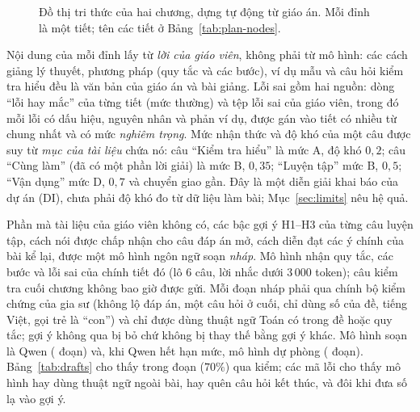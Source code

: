 \begin{figure}[tp]
\centering

\caption{Đồ thị tri thức của hai chương, dựng tự động từ giáo án. Mỗi đỉnh là một tiết; tên các tiết ở Bảng~\ref{tab:plan-nodes}.}
\label{fig:graph}
\end{figure}

Nội dung của mỗi đỉnh lấy từ \emph{lời của giáo viên}, không phải từ mô hình: các cách giảng lý thuyết, phương pháp (quy tắc và các bước), ví dụ mẫu và câu hỏi kiểm tra hiểu đều là văn bản của giáo án và bài giảng. Lỗi sai gồm hai nguồn: dòng ``lỗi hay mắc'' của từng tiết (mức thường) và tệp lỗi sai của giáo viên, trong đó mỗi lỗi có dấu hiệu, nguyên nhân và phản ví dụ, được gán vào tiết có nhiều từ chung nhất và có mức \emph{nghiêm trọng}. Mức nhận thức và độ khó của một câu được suy từ \emph{mục của tài liệu} chứa nó: câu ``Kiểm tra hiểu'' là mức A, độ khó $0{,}2$; câu ``Cùng làm'' (đã có một phần lời giải) là mức B, $0{,}35$; ``Luyện tập'' mức B, $0{,}5$; ``Vận dụng'' mức D, $0{,}7$ và chuyển giao gần. Đây là một diễn giải khai báo của dự án (DI), chưa phải độ khó đo từ dữ liệu làm bài; Mục~\ref{sec:limits} nêu hệ quả.

\begin{table}[tp]
\centering
\caption{Các tiết của hai chương và nội dung của từng tiết (số đơn vị). ``Sau'': các tiết phải học trước; ``Dạng, G/Đ'': số dạng câu cần thành công để qua tiết, \textbf{G} yêu cầu giải thích, \textbf{Đ} yêu cầu có bằng chứng vận dụng.}
\label{tab:plan-nodes}

\end{table}

Phần mà tài liệu của giáo viên không có, các bậc gợi ý H1--H3 của từng câu luyện tập, cách nói được chấp nhận cho câu đáp án mở, cách diễn đạt các ý chính của bài kể lại, được một mô hình ngôn ngữ soạn \emph{nháp}. Mô hình nhận quy tắc, các bước và lỗi sai của chính tiết đó (lô $6$ câu, lời nhắc dưới $3\,000$ token); câu kiểm tra cuối chương không bao giờ được gửi. Mỗi đoạn nháp phải qua chính bộ kiểm chứng của gia sư (không lộ đáp án, một câu hỏi ở cuối, chỉ dùng số của đề, tiếng Việt, gọi trẻ là ``con'') và chỉ được dùng thuật ngữ Toán có trong đề hoặc quy tắc; gợi ý không qua bị bỏ chứ không bị thay thế bằng gợi ý khác. Mô hình soạn là Qwen (\NDraftsQwen{} đoạn) và, khi Qwen hết hạn mức, mô hình dự phòng  (\NDraftsFallback{} đoạn). Bảng~\ref{tab:drafts} cho thấy \NDraftsOk{} trong \NDrafts{} đoạn ($70\%$) qua kiểm; các mã lỗi cho thấy mô hình hay dùng thuật ngữ ngoài bài, hay quên câu hỏi kết thúc, và đôi khi đưa số lạ vào gợi ý.

